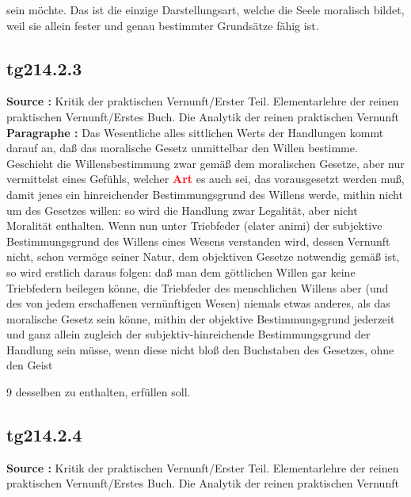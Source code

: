 \documentclass[a4paper,12pt,twoside]{book}
\newcommand{\match}[1]{\textcolor{red}{\textbf{#1}}}
\begin{document}
sein möchte. Das ist die einzige Darstellungsart, welche die Seele moralisch bildet, weil sie allein fester und genau bestimmter Grundsätze fähig ist. 
	
	\subsection*{tg214.2.3} 
	\textbf{Source : }Kritik der praktischen Vernunft/Erster Teil. Elementarlehre der reinen praktischen Vernunft/Erstes Buch. Die Analytik der reinen praktischen Vernunft\\  
	
	\noindent\textbf{Paragraphe : }Das Wesentliche alles sittlichen Werts der Handlungen kommt darauf an, daß das moralische Gesetz unmittelbar den Willen bestimme. Geschieht die Willensbestimmung zwar gemäß dem moralischen Gesetze, aber nur vermittelst eines Gefühls, welcher \match{Art} es auch sei, das vorausgesetzt werden muß, damit jenes ein hinreichender Bestimmungsgrund des Willens werde, mithin nicht um des Gesetzes willen: so wird die Handlung zwar Legalität, aber nicht Moralität enthalten. Wenn nun unter Triebfeder (elater animi) der subjektive Bestimmungsgrund des Willens eines Wesens verstanden wird, dessen Vernunft nicht, schon vermöge seiner Natur, dem objektiven Gesetze notwendig gemäß ist, so wird erstlich daraus folgen: daß man dem göttlichen Willen gar keine Triebfedern beilegen könne, die Triebfeder des menschlichen Willens aber (und des von jedem erschaffenen vernünftigen Wesen) niemals etwas anderes, als das moralische Gesetz sein könne, mithin der objektive Bestimmungsgrund jederzeit und ganz allein zugleich der subjektiv-hinreichende Bestimmungsgrund  der Handlung sein müsse, wenn diese nicht bloß den Buchstaben des Gesetzes, ohne den Geist
	
	
	
	9
	desselben zu enthalten, erfüllen soll. 
	
	\subsection*{tg214.2.4} 
	\textbf{Source : }Kritik der praktischen Vernunft/Erster Teil. Elementarlehre der reinen praktischen Vernunft/Erstes Buch. Die Analytik der reinen praktischen Vernunft\\  
	
\end{document}
